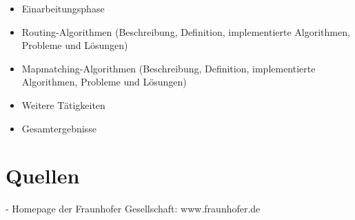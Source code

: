 \documentclass[a4paper]{scrartcl}
\begin{document}
\begin{itemize}
\item Einarbeitungsphase
\item Routing-Algorithmen (Beschreibung, Definition, implementierte Algorithmen, Probleme und Lösungen)
\item Mapmatching-Algorithmen (Beschreibung, Definition, implementierte Algorithmen, Probleme und Lösungen)
\item Weitere Tätigkeiten
\item Gesamtergebnisse
\end{itemize}









\section{Quellen}
\label{sec:quellen}

- Homepage der Fraunhofer Gesellschaft: www.fraunhofer.de
\end{document}
